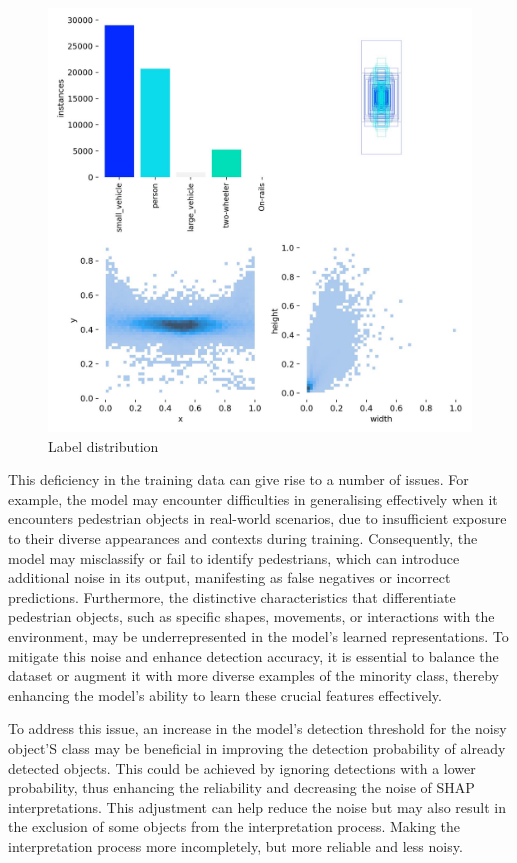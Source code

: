 \begin{figure}[h]
    \centering
    \includegraphics[width=0.5\linewidth]{figures/labels-30}
    \caption{Label distribution}
    \label{fig:Label_distribution}
\end{figure}

This deficiency in the training data can give rise to a number of issues. For example, the model may encounter difficulties in generalising effectively when it encounters pedestrian objects in real-world scenarios, due to insufficient exposure to their diverse appearances and contexts during training.
Consequently, the model may misclassify or fail to identify pedestrians, which can introduce additional noise in its output, manifesting as false negatives or incorrect predictions.
Furthermore, the distinctive characteristics that differentiate pedestrian objects, such as specific shapes, movements, or interactions with the environment, may be underrepresented in the model's learned representations.
To mitigate this noise and enhance detection accuracy, it is essential to balance the dataset or augment it with more diverse examples of the minority class, thereby enhancing the model's ability to learn these crucial features effectively.


To address this issue, an increase in the model's detection threshold for the noisy object'S class may be beneficial in improving the detection probability of already detected objects.
This could be achieved by ignoring detections with a lower probability, thus enhancing the reliability and decreasing the noise
of SHAP interpretations.
This adjustment can help reduce the noise but may also result in the exclusion of some objects from the interpretation process.
Making the interpretation process more incompletely, but more reliable and less noisy.

